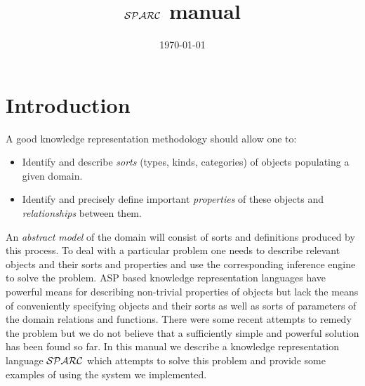 \documentclass[12pt, letterpaper]{article}
\begin{document}
\newcommand{\hide}[1]{}
\newcommand{\exercise}[1]{}
\newcommand{\future}[1]{}
\newcommand{\otherquestions}[1]{}
\newcommand{\set}[1]{\{#1\}}
\newcommand{\pg}[1]{{\tt #1}}
\newtheorem{definition}{Definition}
\newcommand{\emptyclause}{\Box}
\def\st{\bigskip\noindent}
\newcommand{\lplus}
{
   \stackrel{+}{\gets}
}

\newcommand{\fe}[1] {
  \begin{frame}
    #1
  \end{frame}}

\newcommand{\eoa}{ {\bf End} of algorithm}

\newcommand{\ft}[1] {\frametitle{#1}}

\newcommand{\ie}[1] {
  \begin{itemize}
    #1
  \end{itemize}
}

\newcommand{\ee}[1] {
  \begin{enumerate}
    #1
  \end{enumerate}\label{marker}
}
\newcommand{\blk}[2] {
  \begin{block}{#1}
    #2
  \end{block}
}

\newtheorem{collorary}{Corollary}
\newtheorem{proposition}{Proposition}
\newtheorem{invariant}{Invariant}
\newtheorem{property}{Property}
\newtheorem{claim}{Claim}
\newtheorem{example}{Example}


\title{${\cal SPARC}$ manual}

\date{\today}
\maketitle
\section{Introduction}
A good knowledge representation methodology should allow one to:
\begin{itemize}
\item Identify and describe \emph{sorts} (types, kinds,
categories) of objects
populating a given domain.
\item Identify and precisely
define important \emph{properties} of these objects and
\emph{relationships} between them.
\end{itemize}
An \emph{abstract model} of the
domain will consist of sorts
and definitions produced by this process.
To deal with a particular problem one needs to
describe relevant objects and their sorts
and properties and use
the corresponding inference engine to solve the problem.
ASP based knowledge representation languages have powerful
means for describing non-trivial properties of objects
but lack the means of conveniently specifying objects
and their sorts as well as sorts of parameters
of the domain relations and functions. There were some
recent attempts to remedy the problem but we do not believe
that a sufficiently simple and powerful solution has been
found so far. In this manual we describe a knowledge representation
language ${\cal SPARC}$ which attempts to solve this problem and provide some examples of using the system we implemented.
\end{document}
